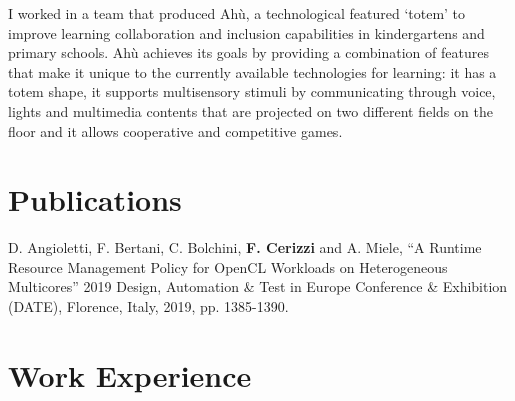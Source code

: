\documentclass[letterpaper]{twentysecondcv} %
\begin{document}
\begin{twenty}
	{}
	{I worked in a team that produced Ahù, a technological featured `totem' to improve learning collaboration and inclusion capabilities in kindergartens and primary schools. Ahù achieves its goals by providing a combination of features that make it unique to the currently available technologies for learning: it has a totem shape, it supports multisensory stimuli by communicating through voice, lights and multimedia contents that are projected on two different fields on the floor and it allows cooperative and competitive games.
			{
			}
	}
	{\footnotesize{}}
	\\
\end{twenty}


\section{Publications}
D. Angioletti, F. Bertani, C. Bolchini, \textbf{F. Cerizzi} and A. Miele, “A Runtime Resource Management Policy for OpenCL Workloads on Heterogeneous Multicores” 2019 Design, Automation \& Test in Europe Conference \& Exhibition (DATE), Florence, Italy, 2019, pp. 1385-1390.\\ {\footnotesize{}}
\vspace{2mm}


\newpage
\makenewprofile


\section{Work Experience}
\end{document}
